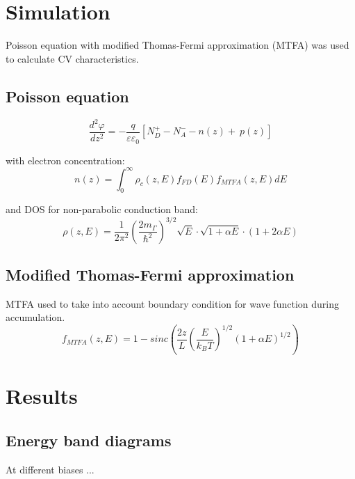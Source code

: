 \documentclass[final]{beamer}
\newcommand{\figfont}{\normalsize} %
\begin{document}
\begin{poster}
\section{Simulation} \justifying

Poisson equation with modified Thomas-Fermi approximation (MTFA) was used to calculate CV characteristics.

\subsection{Poisson equation}

    $$
        \frac{d^2\varphi}{dz^2} =
         -\frac{q}{\varepsilon\varepsilon_0}\left[N_D^+ - N_A^- - n(z) + \
          p(z)\right] 
    $$
    
    with electron concentration:
    $$
        n(z) = \int_{0}^{\infty}\rho_c(z,E) f_{FD}(E) f_{MTFA}(z,E)dE
    $$ 
    
    and  DOS for non-parabolic conduction band:  
    $$
        \rho \left(z,E\right) = \frac{1}{2\pi^2} \left(\frac{2m_{\Gamma}}{\hbar^2}\right)^{3/2} \!\!\! \sqrt{E} \cdot \sqrt{1+\alpha E} \cdot \left(1+ 2\alpha E \right)
    $$  
    

       
\subsection{Modified Thomas-Fermi approximation}
    MTFA used to take into account boundary condition for wave function during accumulation.  
    $$
    f_{MTFA}(z, E)  = 1 - sinc\left( \frac{2z}{L} \left(\frac{E}{k_BT}\right)^{1/2} \left(1+\alpha E\right)^{1/2}\right)
    $$
    
\newcolumn

\section{Results} \justifying
\subsection{Energy band diagrams}
        \centering{
        \figfont
        
        }
At different biases ...


\end{poster}
\end{document}
